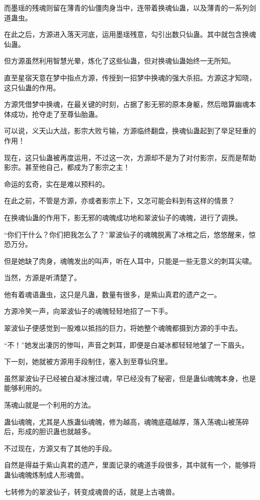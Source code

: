 \begin{this_body}
而墨瑶的残魂则留在薄青的仙僵肉身当中，连带着换魂仙蛊，以及薄青的一系列剑道蛊虫。

在此之后，方源进入落天河底，运用墨瑶残意，勾引出数只仙蛊。其中就包含换魂仙蛊。

但方源虽然利用智慧光晕，炼化了这些仙蛊，但对换魂仙蛊始终一无所知。

直至星宿天意在梦中指点方源，传授到一招梦中换魂的强大杀招。方源这才知晓，这只仙蛊的作用。

方源凭借梦中换魂，在最关键的时刻，占据了影无邪的原本身躯，然后暗算幽魂本体成功，抢夺走了至尊仙胎蛊。

可以说，义天山大战，影宗大败亏输，方源临终翻盘，换魂仙蛊起到了举足轻重的作用！

现在，这只仙蛊被再度运用，不过这一次，方源却不是为了对付影宗，反而是帮助影宗。甚至他自己，都成为了影宗之主！

命运的玄奇，实在是难以预料的。

在此之前，不管是方源，亦或者影宗上下，又怎可能会料到有这样的情景？

在换魂仙蛊的作用下，影无邪的魂魄成功地和翠波仙子的魂魄，进行了调换。

“你们干什么？你们把我怎么了？”翠波仙子的魂魄脱离了冰棺之后，悠悠醒来，惊恐万分。

但是她缺了肉身，魂魄发出的叫声，听在人耳中，只能是一些无意义的刺耳尖啸。

当然，方源是听清楚了。

他有着魂语蛊虫，这只是凡蛊，数量有很多，是紫山真君的遗产之一。

方源冷笑一声，向翠波仙子的魂魄轻轻地招了一下手。

翠波仙子便感觉到一股难以抵挡的巨力，将她整个魂魄都摄到方源的手中去。

“不！”她发出凄厉的惨叫，声音之刺耳，即便是白凝冰都轻轻地皱了一下眉头。

下一刻，她就被方源用手段制住，塞入到至尊仙窍里。

虽然翠波仙子已经被白凝冰搜过魂，早已经没有了秘密，但是蛊仙魂魄本身，也是能够利用的。

荡魂山就是一个利用的方法。

蛊仙魂魄，尤其是人族蛊仙魂魄，修为越高，魂魄底蕴越厚，落入荡魂山被荡碎后，形成的胆识蛊也就越多。

不过现在，方源又有了其他的手段。

自然是得益于紫山真君的遗产，里面记录的魂道手段很多，其中就有一个，能够将蛊仙魂魄炼制成人形魂兽。

七转修为的翠波仙子，转变成魂兽的话，就是上古魂兽。


\end{this_body}
